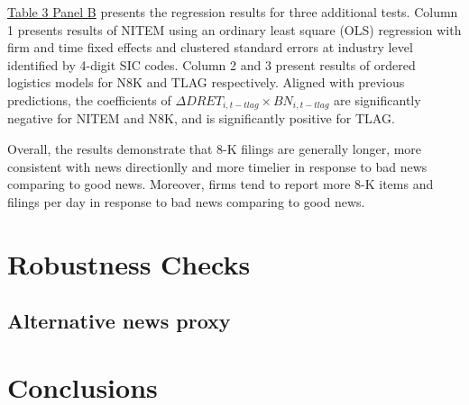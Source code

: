 \documentclass[a4paper]{article}
\begin{document}
\begin{spacing}{2}
\hyperref[T3PB]{Table 3 Panel B} presents the regression results for three additional tests. Column 1 presents results of NITEM using an ordinary least square (OLS) regression with firm and time fixed effects and clustered standard errors at industry level identified by 4-digit SIC codes. Column 2 and 3 present results of ordered logistics models for N8K and TLAG respectively. Aligned with previous predictions, the coefficients of $\Delta DRET_{i,t-tlag}\times BN_{i,t-tlag}$ are significantly negative for NITEM and N8K, and is significantly positive for TLAG.

Overall, the results demonstrate that 8-K filings are generally longer, more consistent with news directionlly and more timelier in response to bad news comparing to good news. Moreover, firms tend to report more 8-K items and filings per day in response to bad news comparing to good news. 
\section{Robustness Checks}

\subsection{Alternative news proxy}
\section{Conclusions}

\end{spacing}

\newpage



\newpage


\newpage


\newpage


\newpage
\setcounter{page}{1}

\end{document}

